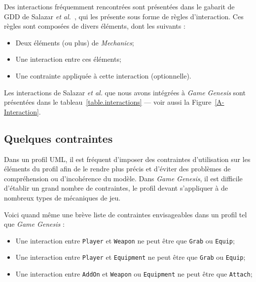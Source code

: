 Des interactions fréquemment rencontrées sont présentées dans le gabarit de GDD de Salazar \emph{et al.}~\cite{salazar_gdd}, qui les présente sous forme de règles d'interaction.
Ces règles sont composées de divers éléments, dont les suivants :
\begin{itemize}
    \item Deux \'el\'ements (ou plus) de \emph{Mechanics};
    \item Une interaction entre ces \'el\'ements;
    \item Une contrainte appliquée à cette interaction (optionnelle).
\end{itemize}
Les interactions de Salazar \emph{et al.} que nous avons intégrées à \emph{Game Genesis} sont présentées dans le tableau~\ref{table.interactions} --- voir aussi la Figure~\ref{A-Interaction}.




\subsection{Quelques contraintes}

Dans un profil UML, il est fréquent d'imposer des contraintes d'utilisation sur les \'el\'ements du profil afin de le rendre plus précis et d'éviter des problèmes de compréhension ou d'incohérence du modèle.
Dans \emph{Game Genesis}, il est difficile d'établir un grand nombre de contraintes, le profil devant s'appliquer à de nombreux types de mécaniques de jeu.

Voici quand m\^eme une br\`eve liste de contraintes envisageables dans un profil tel que \emph{Game Genesis} :
\begin{itemize}
    \item Une interaction entre \texttt{Player} et \texttt{Weapon} ne peut être que \texttt{Grab} ou \texttt{Equip};
    \item Une interaction entre \texttt{Player} et \texttt{Equipment} ne peut être que \texttt{Grab} ou \texttt{Equip};
    \item Une interaction entre \texttt{AddOn} et \texttt{Weapon} ou \texttt{Equipment} ne peut être que \texttt{Attach};
\end{itemize}

